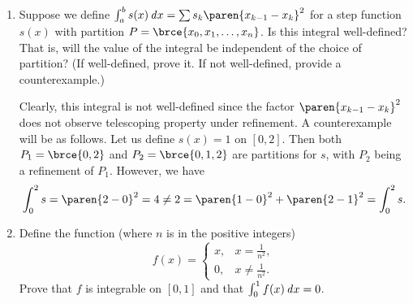 \documentclass[a4paper]{article}
\begin{document}
\begin{enumerate}
  \begin{proof}
    We have
    \begin{align*}
      \int_1^b \frac{\dx}{x}
        &= \frac1a \int_a^{ab} \frac{\dx}{x/a} && \reason{by Theorem~1.19,} \\
        &= \int_a^{ab} \frac{\dx}{x} && \reason{by homogeneity and cancellation,} \\
        &= \int_a^1 \frac{\dx}{x} + \int_1^{ab} \frac{\dx}x && \reason{by Theorem~1.17,} \\
        &= -\int_1^a \frac{\dx}{x} + \int_1^{ab} \frac{\dx}x && \reason{by our convention.}
    \end{align*}
    Move the first term of the RHS to the LHS and we obtain the equation.
  \end{proof}

  We can rewrite the equation in terms of the function \(f\) as
  \[
    f(a) + f(b) = f(ab).
  \]
  The logarithm functions observe the stated property
  \[
    \log a + \log b = \log ab.
  \]

\item Suppose we define
  \(\int_a^b s(x) \dx = \sum s_k \paren{x_{k-1} - x_k}^2\) for a step
  function \(s(x)\) with partition \(P = \brce{x_0, x_1, \dotsc, x_n}\).
  Is this integral well-defined?  That is, will the value of the integral
  be independent of the choice of partition?  (If well-defined, prove it.
  If not well-defined, provide a counterexample.)

  Clearly, this integral is not well-defined since the factor
  \(\paren{x_{k-1} - x_k}^2\) does not observe telescoping property
  under refinement.  A counterexample will be as follows.  Let us define
  \(s(x) = 1\) on \([0, 2]\).  Then both \(P_1 = \brce{0, 2}\) and
  \(P_2 = \brce{0, 1, 2}\) are partitions for \(s\), with \(P_2\) being
  a refinement of \(P_1\).  However, we have
  \begin{displaymath}
    \int_0^2 s = \paren{2-0}^2 = 4 \ne 2 = \paren{1-0}^2 + \paren{2-1}^2 = \int_0^2 s.
  \end{displaymath}

\item[\bonus] Define the function (where \(n\) is in the positive integers)
  \[
    f(x) =
    \begin{cases}
      x, & x = \frac1{n^2}, \\[1ex]
      0, & x \ne \frac1{n^2}.
    \end{cases}
  \]
  Prove that \(f\) is integrable on \([0, 1]\) and that
  \(\int_0^1 f(x) \mathop{}\!\mathit{d} x = 0\).


\end{enumerate}
\end{document}

